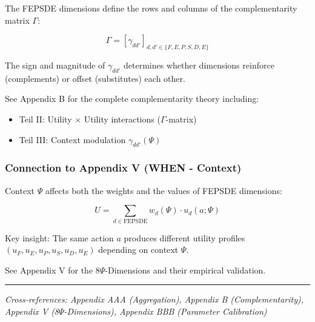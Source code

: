 The FEPSDE dimensions define the rows and columns of the complementarity 
matrix $\Gamma$:

\begin{equation}
\Gamma = [\gamma_{dd'}]_{d, d' \in \{F, E, P, S, D, E\}}
\end{equation}

The sign and magnitude of $\gamma_{dd'}$ determines whether dimensions 
reinforce (complements) or offset (substitutes) each other.

See Appendix B for the complete complementarity theory including:
\begin{itemize}
    \item Teil II: Utility $\times$ Utility interactions ($\Gamma$-matrix)
    \item Teil III: Context modulation $\gamma_{dd'}(\Psi)$
\end{itemize}

\subsubsection{Connection to Appendix V (WHEN - Context)}

Context $\Psi$ affects both the weights and the values of FEPSDE dimensions:

\begin{equation}
U = \sum_{d \in \text{FEPSDE}} w_d(\Psi) \cdot u_d(a; \Psi)
\end{equation}

Key insight: The same action $a$ produces different utility profiles 
$(u_F, u_E, u_P, u_S, u_D, u_E)$ depending on context $\Psi$.

See Appendix V for the 8$\Psi$-Dimensions and their empirical validation.

\vspace{0.5em}
\hrule
\vspace{0.5em}
\noindent\textit{Cross-references: Appendix AAA (Aggregation), 
Appendix B (Complementarity), Appendix V (8$\Psi$-Dimensions), 
Appendix BBB (Parameter Calibration)}

